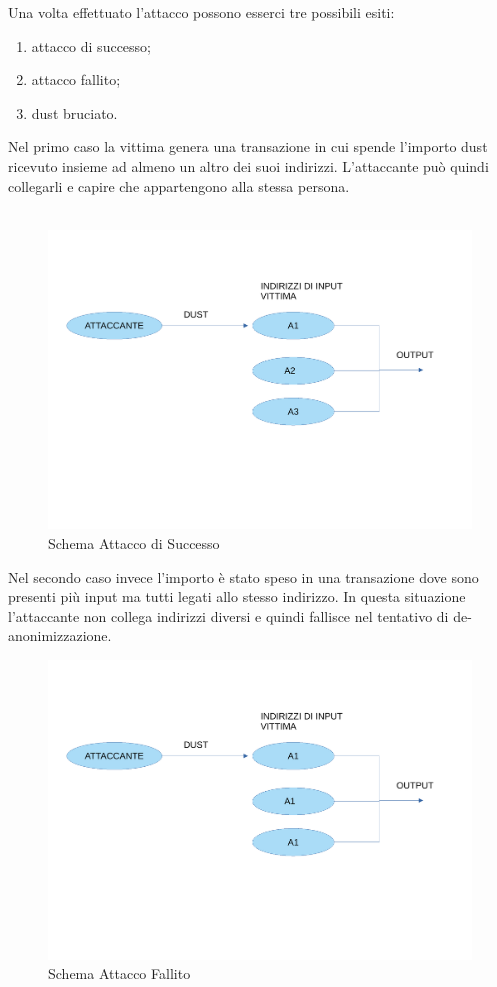 \FloatBarrier
Una volta effettuato l'attacco possono esserci tre possibili esiti: 
    \begin{enumerate}
        \item attacco di successo;
        \item attacco fallito;
        \item dust bruciato.
    \end{enumerate}
Nel primo caso la vittima genera una transazione in cui spende l'importo dust ricevuto insieme ad almeno un altro dei suoi indirizzi. L'attaccante può quindi collegarli e capire che appartengono alla stessa persona.\\\\
\begin{figure}[h!]
    \centering
    \includegraphics[scale=0.3]{Images/successo.pdf}
    \caption{Schema Attacco di Successo}
    \label{fig:success}
\end{figure}
\FloatBarrier
Nel secondo caso invece l'importo è stato speso in una transazione dove sono presenti più input ma tutti legati allo stesso indirizzo. In questa situazione l'attaccante non collega indirizzi diversi e quindi fallisce nel tentativo di de-anonimizzazione. 
\begin{figure}[h!]
    \centering
    \includegraphics[scale=0.35]{Images/fallimento.pdf}
    \caption{Schema Attacco Fallito}
    \label{fig:fallito}
\end{figure}
